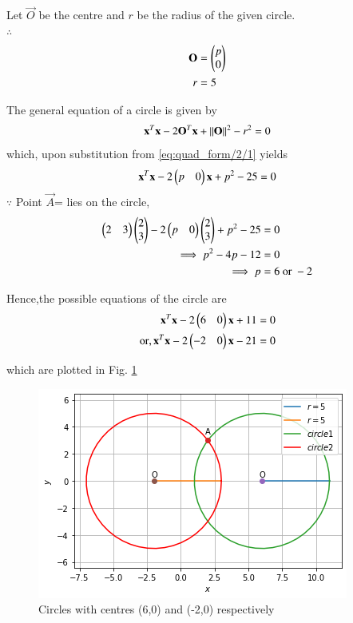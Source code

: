 Let $\vec{O}$ be the centre and $r$ be the radius of the given circle.
\\
$\therefore$
\begin{align}
    \label{eq:quad_form/2/1}
    \begin{split}
\mathbf{O} &= \begin{pmatrix}p\\0\end{pmatrix}
\\
r &= 5
    \end{split}
\end{align}

The general equation of a circle is given by 
\begin{align}
\mathbf{x}^T\mathbf{x} - 2\mathbf{O}^T\mathbf{x} + \left\lVert\mathbf{O}\right\rVert^2 -r^2 = 0
\end{align}
which, upon substitution from \eqref{eq:quad_form/2/1} yields
\begin{align}
\mathbf{x}^T\mathbf{x} - 2\begin{pmatrix}p & 0\end{pmatrix}\mathbf{x} + p^2 - 25 = 0
\end{align}
$\because$
Point $\vec{A}$= lies on the circle, 
%
\begin{align}
\begin{pmatrix}2 & 3\end{pmatrix}\begin{pmatrix}2\\3\end{pmatrix} - 2\begin{pmatrix}p & 0\end{pmatrix}\begin{pmatrix}2\\3\end{pmatrix} + p^2 -25 &=0
\\
\implies p^2 - 4p - 12 &=0
\\
\implies p &=6 
\text{ or } -2
\end{align}

Hence,the possible equations of the circle are
\begin{align}
\mathbf{x}^T\mathbf{x} - 2\begin{pmatrix}6 & 0\end{pmatrix}\mathbf{x} + 11 &= 0 \label{quad_form/2/1eq:1}
\\
\text{or}, \mathbf{x}^T\mathbf{x} - 2\begin{pmatrix}-2 & 0\end{pmatrix}\mathbf{x} - 21 &= 0 \label{quad_form/2/1eq:2}
\end{align}

which are plotted in Fig. \ref{quad_form/2/1fig:circle}	


\begin{figure}[!ht]
\centering
\includegraphics[width=\columnwidth]{solutions/su2021/2/1/Figure5.png}
\caption{Circles with centres (6,0) and (-2,0) respectively }
\label{quad_form/2/1fig:circle}	
\end{figure}


